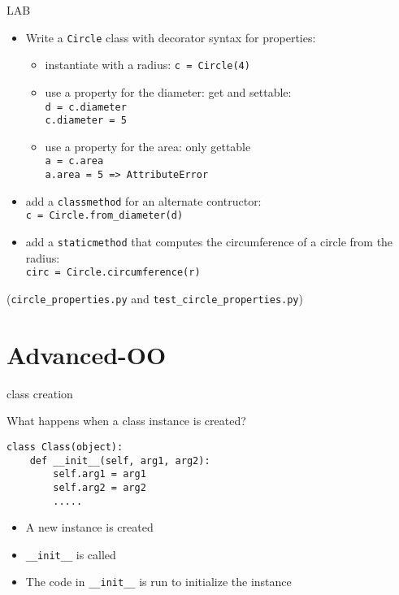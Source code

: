 \documentclass{beamer}
\begin{document}
\begin{frame}[fragile]{LAB}

\begin{itemize}
  \item Write a \verb|Circle| class with decorator syntax for properties:
  \begin{itemize}
  \item instantiate with a radius: \verb|c = Circle(4)|
  \item use a property for the diameter: get and settable:\\
        \verb|d = c.diameter| \\
        \verb|c.diameter = 5|
  \item use a property for the area: only gettable\\
        \verb|a = c.area| \\
        \verb|a.area = 5 => AttributeError|
  \end{itemize}
  
  \item add a \verb|classmethod| for an alternate contructor:\\
     \verb|c = Circle.from_diameter(d)|

  \item add a \verb|staticmethod| that computes the circumference of a circle from the radius:\\
     \verb|circ = Circle.circumference(r)|


\end{itemize}


\vfill
(\verb|circle_properties.py| and \verb|test_circle_properties.py|)

\end{frame}


\section{Advanced-OO}

\begin{frame}[fragile]{class creation}

{\Large What happens when a class instance is created?}

\vfill
\begin{verbatim}
class Class(object):
    def __init__(self, arg1, arg2):
        self.arg1 = arg1
        self.arg2 = arg2
        .....
\end{verbatim}
\vfill

\begin{itemize}
  \item A new instance is created
  \item \verb|__init__| is called
  \item The code in \verb|__init__| is run to initialize the instance
\end{itemize}
\vfill

\end{frame} 
\end{document}
